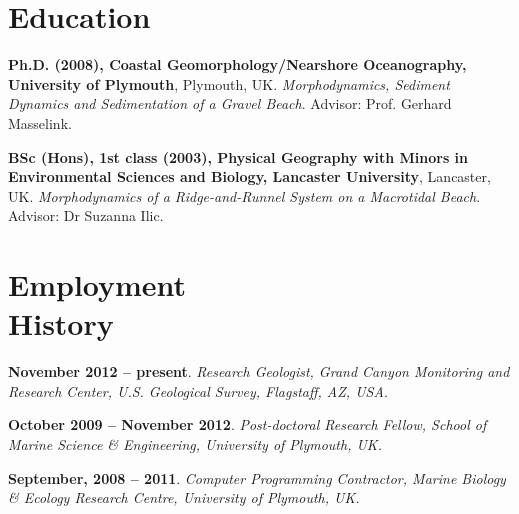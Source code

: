 \documentclass[margin,line]{resume}
\begin{document}
\begin{resume}
    \section{\mysidestyle Education}
    \begin{footnotesize}

    {\bf Ph.D. (2008), Coastal Geomorphology/Nearshore Oceanography, University of Plymouth}, Plymouth, UK. {\sl Morphodynamics, Sediment Dynamics and Sedimentation of a Gravel Beach}. Advisor:  Prof. Gerhard Masselink.\vspace{2mm}

    {\bf BSc (Hons), 1st class (2003), Physical Geography with Minors in Environmental Sciences and Biology, Lancaster University}, Lancaster, UK.  {\sl Morphodynamics of a Ridge-and-Runnel System on a Macrotidal Beach}. Advisor:  Dr Suzanna Ilic. \vspace{2mm}
     \end{footnotesize}

    \section{\mysidestyle Employment\\History}
    \begin{footnotesize}

    {\bf November 2012 --  present}. {\sl Research Geologist, Grand Canyon Monitoring and Research Center, U.S. Geological Survey, Flagstaff, AZ, USA.}

    {\bf October 2009 -- November 2012}. {\sl Post-doctoral Research Fellow, School of Marine Science \& Engineering, University of Plymouth, UK.} %

    {\bf September, 2008 -- 2011}. {\sl Computer Programming Contractor, Marine Biology \& Ecology Research Centre, University of Plymouth, UK.} %


\end{footnotesize}
\end{resume}
\end{document}
